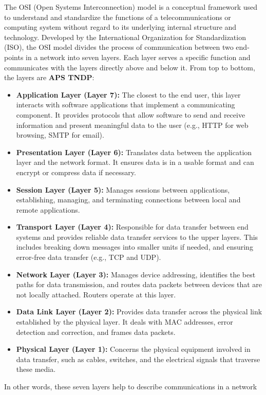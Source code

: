 \documentclass{report}
\begin{document}
     \pagebreak 
     \bigbreak \noindent 
     The OSI (Open Systems Interconnection) model is a conceptual framework used to understand and standardize the functions of a telecommunications or computing system without regard to its underlying internal structure and technology. Developed by the International Organization for Standardization (ISO), the OSI model divides the process of communication between two end-points in a network into seven layers. Each layer serves a specific function and communicates with the layers directly above and below it. From top to bottom, the layers are \textbf{APS TNDP}:
     \begin{itemize}
         \item \textbf{Application Layer (Layer 7):} The closest to the end user, this layer interacts with software applications that implement a communicating component. It provides protocols that allow software to send and receive information and present meaningful data to the user (e.g., HTTP for web browsing, SMTP for email).
         \item \textbf{Presentation Layer (Layer 6):} Translates data between the application layer and the network format. It ensures data is in a usable format and can encrypt or compress data if necessary.
         \item \textbf{Session Layer (Layer 5):} Manages sessions between applications, establishing, managing, and terminating connections between local and remote applications.
         \item \textbf{Transport Layer (Layer 4):} Responsible for data transfer between end systems and provides reliable data transfer services to the upper layers. This includes breaking down messages into smaller units if needed, and ensuring error-free data transfer (e.g., TCP and UDP).
         \item \textbf{Network Layer (Layer 3):} Manages device addressing, identifies the best paths for data transmission, and routes data packets between devices that are not locally attached. Routers operate at this layer.
         \item \textbf{Data Link Layer (Layer 2):} Provides data transfer across the physical link established by the physical layer. It deals with MAC addresses, error detection and correction, and frames data packets.
         \item \textbf{Physical Layer (Layer 1):} Concerns the physical equipment involved in data transfer, such as cables, switches, and the electrical signals that traverse these media.
     \end{itemize}
     \bigbreak \noindent 
     In other words, these seven layers help to describe communications in a network
     \bigbreak \noindent 
     \pagebreak \bigbreak \noindent 
     \bigbreak \noindent 
\end{document}

